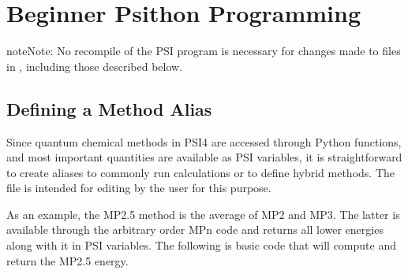 \documentclass[letterpaper,10pt,english]{sphinxmanual}
\begin{document}

\begin{fulllineitems}
\label{index:frac.frac_traverse}
\end{fulllineitems}


\begin{fulllineitems}
\label{index:frac.ip_fitting}
\end{fulllineitems}



\chapter{Beginner Psithon Programming}
\label{index:beginner-psithon-programming}
\begin{notice}{note}{Note:}
No recompile of the PSI program is necessary for changes made to
files in , including those described below.
\end{notice}


\section{Defining a Method Alias}
\label{index:defining-a-method-alias}
Since quantum chemical methods in PSI4 are accessed through Python functions, and
most important quantities are available as PSI variables, it is straightforward
to create aliases to commonly run calculations or to define hybrid methods. The
 file is intended for editing by the user for
this purpose.

As an example, the MP2.5 method is the average of MP2 and MP3. The latter is
available through the arbitrary order MPn code and returns all lower energies
along with it in PSI variables. The following is basic code that will compute
and return the MP2.5 energy.
\end{document}
